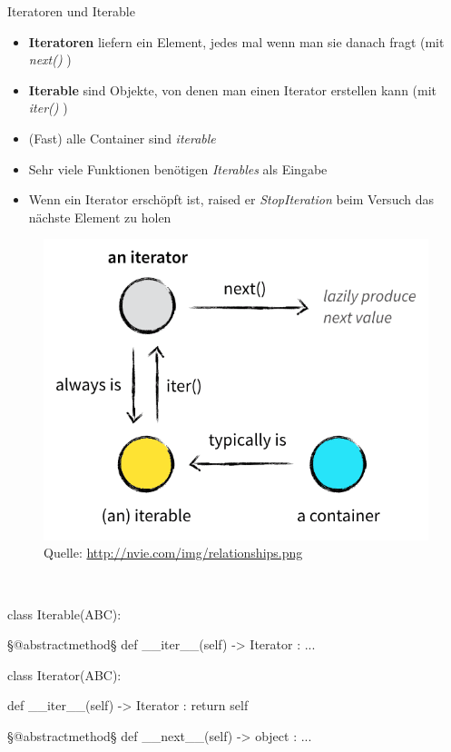 \documentclass[ngerman]{beamer}
\theoremstyle{definition}
\begin{document}
\begin{frame}{Iteratoren und Iterable}
	\begin{itemize}
		\item {\textbf{Iteratoren} liefern ein Element, jedes mal wenn man sie danach fragt (mit \emph{next()} )}
		\item {\textbf{Iterable} sind Objekte, von denen man einen Iterator erstellen kann (mit \emph{iter()} )}
		\item {(Fast) alle Container sind \emph{iterable}}
		\item {Sehr viele Funktionen benötigen \emph{Iterables} als Eingabe}
		\item {Wenn ein Iterator erschöpft ist, raised er \emph{StopIteration} beim Versuch das nächste Element zu holen}
		\end{itemize}
\framebreak
	\begin{figure}
		\includegraphics[scale=0.6]{relationships1.png}\break
		{\tiny Quelle: \url{http://nvie.com/img/relationships.png}}
	\end{figure}
\framebreak
\begin{exampleblock}
~
\begin{python}
class Iterable(ABC):
	
	§@abstractmethod§
	def __iter__(self) -> Iterator : ...
	
	
class Iterator(ABC):

	def __iter__(self) -> Iterator :
		return self

	§@abstractmethod§
	def __next__(self) -> object : ...
	
\end{python}
\end{exampleblock}
\end{frame}
\end{document}
